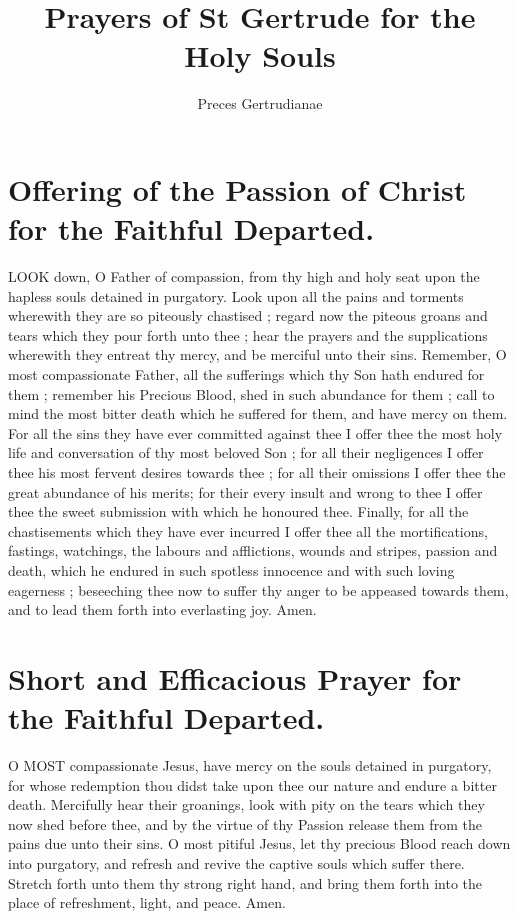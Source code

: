 \documentclass[a5paper,12pt]{memoir}
\title{Prayers of St Gertrude for the Holy Souls}
\author{Preces Gertrudianae}
\begin{document}
\maketitle

\section{Offering of the Passion of Christ for the Faithful Departed.}

LOOK down, O Father of compassion, from thy high and 
holy seat upon the hapless souls detained in 
purgatory. Look upon all the pains and torments wherewith they 
are so piteously chastised ; regard now the 
piteous groans and 
tears which they pour 
forth unto thee ; hear 
the prayers and the 
supplications wherewith they entreat thy 
mercy, and be merciful unto their sins. Remember, O most compassionate Father, all 
the sufferings which 
thy Son hath endured 
for them ; remember 
his Precious Blood, shed 
in such abundance 
for them ; call to mind 
the most bitter death 
which he suffered for 
them, and have mercy on them. For all 
the sins they have ever committed against 
thee I offer thee the 
most holy life and conversation of thy most 
beloved Son ; for all 
their negligences I offer thee his most fervent desires towards 
thee ; for all their 
omissions I offer thee 
the great abundance 
of his merits; for their 
every insult and wrong 
to thee I offer thee 
the sweet submission 
with which he honoured thee. Finally, 
for all the chastisements which they have 
ever incurred I offer 
thee all the mortifications, fastings, watchings, the labours and 
afflictions, wounds and 
stripes, passion and 
death, which he endured in such spotless innocence and 
with such loving eagerness ; beseeching 
thee now to suffer thy 
anger to be appeased 
towards them, and to 
lead them forth into 
everlasting joy. Amen. 

\section{Short and Efficacious Prayer for the Faithful Departed.}

O MOST compassionate Jesus, 
have mercy on the 
souls detained in purgatory, for whose redemption thou didst 
take upon thee our 
nature and endure a 
bitter death. Mercifully hear their groanings, look with pity 
on the tears which 
they now shed before 
thee, and by the virtue of thy Passion release them from the 
pains due unto their 
sins. O most pitiful 
Jesus, let thy precious 
Blood reach down into purgatory, and refresh and revive the 
captive souls which 
suffer there. Stretch forth unto them thy 
strong right hand, 
and bring them forth 
into the place of refreshment, light, and 
peace. Amen. 
\end{document}
